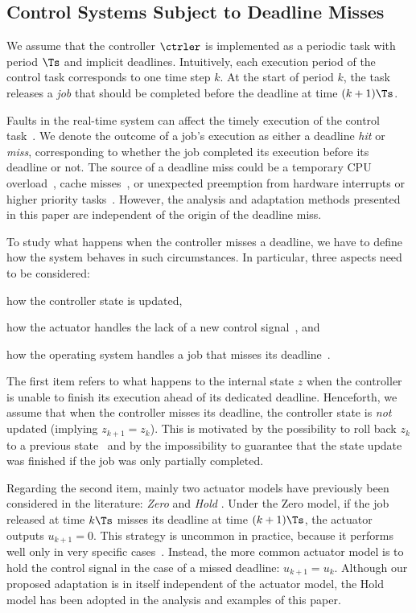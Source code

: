 \subsection{Control Systems Subject to Deadline Misses}

We assume that the controller $\ctrler$ is implemented as a periodic task with period $\Ts$ and implicit deadlines. 
Intuitively, each execution period of the control task corresponds to one time step $k$.
At the start of period $k$, the task releases a \emph{job} that should be completed before the deadline at time $(k+1) \Ts$.

Faults in the real-time system can affect the timely execution of the control task~\cite{Steinbauer:2013}.
We denote the outcome of a job's execution as either a deadline \emph{hit} or \emph{miss}, corresponding to whether the job completed its execution before its deadline or not. 
The source of a deadline miss could be a temporary CPU overload~\cite{Baruah:1997}, cache misses~\cite{Milligan:1996, Wang:2012},  or unexpected preemption from hardware interrupts or higher priority tasks~\cite{Stankovic:1995}.
However, the analysis and adaptation methods presented in this paper are independent of the origin of the deadline miss.

To study what happens when the controller misses a deadline, we have to define how the system behaves in such circumstances.
In particular, three aspects need to be considered: 
\begin{enumerate*}[label=(\roman*)]
    \item how the controller state is updated, 
    \item how the actuator handles the lack of a new control signal~\cite{Schenato:2009}, and
    \item how the operating system handles a job that misses its deadline~\cite{Pazzaglia:2019, Cervin:2005}.
\end{enumerate*}
The first item refers to what happens to the internal state $z$ when the controller is unable to finish its execution ahead of its dedicated deadline.
Henceforth, we assume that when the controller misses its deadline, the controller state is \emph{not} updated (implying $z_{k+1} = z_k$). 
This is motivated by the possibility to roll back $z_k$ to a previous state~\cite{akesson:2020, Seong:2001, Zhang:2003} and by the impossibility to guarantee that the state update was finished if the job was only partially completed.

Regarding the second item, mainly two actuator models have previously been considered in the literature: \emph{Zero} and \emph{Hold} \cite{Schenato:2009}.
Under the Zero model, if the job released at time $k\Ts$ misses its deadline at time  $(k+1)\Ts$, the actuator outputs $u_{k+1} = 0$.
This strategy is uncommon in practice, because it performs well only in very specific cases~\cite{Vreman:2021ecrts}. 
Instead, the more common actuator model is to hold the control signal in the case of a missed deadline: $u_{k+1} = u_k$.
Although our proposed adaptation is in itself independent of the actuator model, the Hold model has been adopted in the analysis and examples of this paper.


